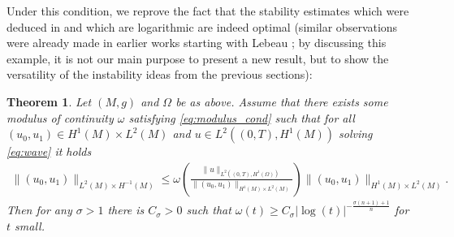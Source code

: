 \documentclass[12pt,twoside]{amsart}
\numberwithin{equation}{section}
\renewcommand{\leq}{\leqslant}
\renewcommand{\geq}{\geqslant}
\newtheorem{theorem}{Theorem}[section]
\begin{document}
Under this condition, we reprove the fact that the stability estimates which were deduced in \cite{LaurentLeautaud} and which are logarithmic are indeed optimal (similar observations were already made in earlier works starting with Lebeau \cite{Lebeau}; by discussing this example, it is not our main purpose to present a new result, but to show the versatility of the instability ideas from the previous sections):

\begin{theorem}
\label{thm:wave_instab_UCP}
Let $(M,g)$ and $\Omega$ be as above. Assume that there exists some modulus of continuity $\omega$ satisfying \eqref{eq:modulus_cond} such that for all $(u_0, u_1) \in H^1(M) \times L^2(M)$ and $u\in L^2((0,T), H^1(M))$ solving \eqref{eq:wave} it holds
\begin{align*}
\|(u_0,u_1)\|_{L^2(M)\times H^{-1}(M)}
\leq \omega\left( \frac{\|u\|_{L^2((0,T),H^1(\Omega))}}{\|(u_0,u_1)\|_{H^1(M)\times L^2(M)}} \right) \|(u_0,u_1)\|_{H^1(M)\times L^2(M)}.
\end{align*}
Then for any $\sigma>1$ there is $C_{\sigma} >0$ such that $\omega(t) \geq C_\sigma |\log(t)|^{- \frac{\sigma(n+1)+1}{n}}$ for $t$ small.
\end{theorem}
\end{document}
